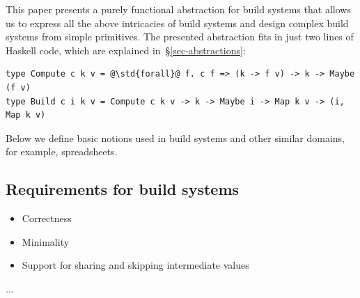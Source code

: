 This paper presents a purely functional abstraction for build systems that
allows us to express all the above intricacies of build systems and design
complex build systems from simple primitives. The presented abstraction fits in
just two lines of Haskell code, which are explained
in~\S\ref{sec-abstractions}:

\begin{verbatim}
type Compute c k v = @\std{forall}@ f. c f => (k -> f v) -> k -> Maybe (f v)
type Build c i k v = Compute c k v -> k -> Maybe i -> Map k v -> (i, Map k v)
\end{verbatim}


Below we define basic notions used in build systems and other similar domains,
for example, spreadsheets.


\subsection{Requirements for build systems}

\begin{itemize}
    \item Correctness
    \item Minimality
    \item Support for sharing and skipping intermediate values
\end{itemize}
...
